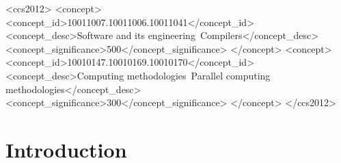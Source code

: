 \documentclass[sigconf]{acmart}
\begin{document}
\begin{abstract}
\end{abstract}

\begin{CCSXML}
<ccs2012>
  <concept>
    <concept_id>10011007.10011006.10011041</concept_id>
    <concept_desc>Software and its engineering~Compilers</concept_desc>
    <concept_significance>500</concept_significance>
  </concept>
  <concept>
    <concept_id>10010147.10010169.10010170</concept_id>
    <concept_desc>Computing methodologies~Parallel computing methodologies</concept_desc>
    <concept_significance>300</concept_significance>
  </concept>
</ccs2012>
\end{CCSXML}



\maketitle

\section{Introduction}
\label{sec:intro}
\end{document}
